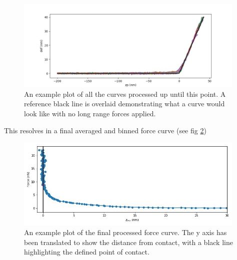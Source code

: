 \begin{figure}[h!]     %
        \begin{center}
          \includegraphics[width=110mm]{chapter4/proc_force_sep_mastercurve.jpg}
\end{center}
\caption{An example plot of all the curves processed up until this point. A reference black line is overlaid demonstrating what a curve would look like with no long range forces applied.}
\label{fig:proc_force_sep_mastercurve}                 %
\end{figure}






This resolves in a final averaged and binned force curve (see fig \ref{fig:EgFinalCurve})

\begin{figure}[h!!!]     %
        \begin{center}
          \includegraphics[width=110mm]{chapter4/EgFinalCurve.jpg}
\end{center}
\caption{An example plot of the final processed force curve. The y axis has been translated to show the distance from contact, with a black line highlighting the defined point of contact.}
\label{fig:EgFinalCurve}                 %
\end{figure}

